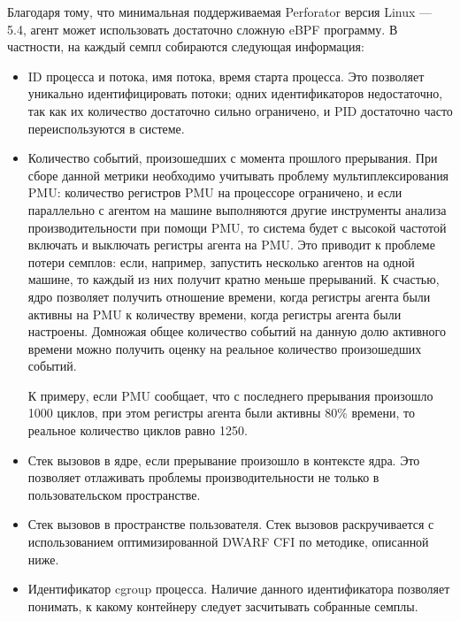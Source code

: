 Благодаря тому, что минимальная поддерживаемая Perforator версия Linux --- 5.4, агент может использовать
достаточно сложную eBPF программу. В частности, на каждый семпл собираются следующая информация:
\begin{itemize}
    \item
        ID процесса и потока, имя потока, время старта процесса.
        Это позволяет уникально идентифицировать потоки; одних идентификаторов недостаточно, так как их количество достаточно сильно
        ограничено, и PID достаточно часто переиспользуются в системе.

    \item
        Количество событий, произошедших с момента прошлого прерывания.
        При сборе данной метрики необходимо учитывать проблему мультиплексирования PMU:
        количество регистров PMU на процессоре ограничено, и если параллельно с агентом на машине выполняются другие инструменты
        анализа производительности при помощи PMU, то система будет с высокой частотой включать и выключать регистры агента на PMU.
        Это приводит к проблеме потери семплов: если, например, запустить несколько агентов на одной машине, то
        каждый из них получит кратно меньше прерываний.
        К счастью, ядро позволяет получить отношение времени, когда регистры агента были активны на
        PMU к количеству времени, когда регистры агента были настроены.
        Домножая общее количество событий на данную долю активного времени можно получить оценку на реальное количество произошедших
        событий.

        К примеру, если PMU сообщает, что с последнего прерывания произошло 1000 циклов, при этом регистры агента были активны 80\% времени,
        то реальное количество циклов равно 1250.

    \item
        Стек вызовов в ядре, если прерывание произошло в контексте ядра.
        Это позволяет отлаживать проблемы производительности не только в пользовательском пространстве.

    \item
        Стек вызовов в пространстве пользователя.
        Стек вызовов раскручивается с использованием оптимизированной DWARF CFI по методике, описанной ниже.

    \item
        Идентификатор cgroup процесса.
        Наличие данного идентификатора позволяет понимать, к какому контейнеру следует засчитывать собранные семплы.
\end{itemize}

